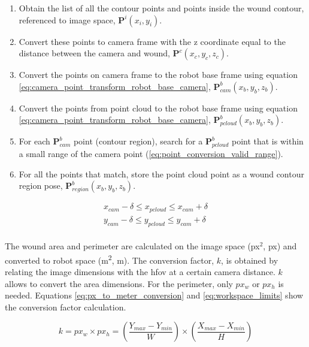 \begin{enumerate}
    \item Obtain the list of all the contour points and points inside the wound contour, referenced to image space, $\boldsymbol{P}^i(x_i, y_i)$.
    \item Convert these points to camera frame with the z coordinate equal to the distance between the camera and wound, $\boldsymbol{P}^c(x_c, y_c, z_c)$.
    \item Convert the points on camera frame to the robot base frame using equation \ref{eq:camera_point_transform_robot_base_camera}, $\boldsymbol{P}^b_{cam}(x_b, y_b, z_b)$.
    \item Convert the points from point cloud to the robot base frame using equation \ref{eq:camera_point_transform_robot_base_camera}, $\boldsymbol{P}^b_{pcloud}(x_b, y_b, z_b)$.
    \item For each $\boldsymbol{P}^b_{cam}$ point (contour region), search for a $\boldsymbol{P}^b_{pcloud}$ point that is within a small range of the camera point (\ref{eq:point_conversion_valid_range}).
    \item For all the points that match, store the point cloud point as a wound contour region pose, $\boldsymbol{P}^b_{region}(x_b, y_b, z_b)$.
\end{enumerate}

\begin{equation}
\label{eq:point_conversion_valid_range}
    \left.
    \begin{aligned}
    x_{cam} - \delta \le x_{pcloud} \le x_{cam} + \delta\\
    y_{cam} - \delta \le y_{pcloud} \le y_{cam} + \delta
    \end{aligned}
    \right.
\end{equation}\\

The wound area and perimeter are calculated on the image space (px$^2$, px) and converted to robot space (\si{\meter \squared}, \si{\meter}). The conversion factor, $k$, is obtained by relating the image dimensions with the \gls{hfov} at a certain camera distance. $k$ allows to convert the area dimensions. For the perimeter, only $px_w$ or $px_h$ is needed. Equations \ref{eq:px_to_meter_conversion} and \ref{eq:workspace_limits} show the conversion factor calculation.

\begin{equation}
k = px_w \times px_h = (\frac{Y_{max} - Y_{min}}{W}) \times (\frac{X_{max} - X_{min}}{H})
\label{eq:px_to_meter_conversion}
\end{equation}


